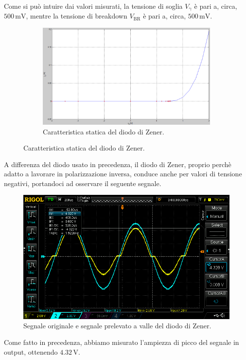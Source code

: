 \documentclass[a4paper]{article}
\begin{document}
{{				Come si può intuire dai valori misurati, la tensione di soglia $ V_{\mathrm{\gamma}} $ è pari a, circa, $ 500 \, \mathrm{mV} $, mentre la tensione di breakdown $ V_{\mathrm{BR}} $ è pari a, circa, $ 500 \, \mathrm{mV} $.
				\begin{figure}[h!]
					\centering
					\begin{subfigure}{0.4\textwidth}
						\centering
						\includegraphics[scale=0.3]{caratteristicheStaticheDiodoDiZenerCaratteristica}
						\caption{Caratteristica statica del diodo di Zener.}
					\end{subfigure}
					\label{fig:caratteristicheStaticheDiodoDiZener}
				\end{figure}
				A differenza del diodo usato in precedenza, il diodo di Zener, proprio perchè adatto a lavorare in polarizzazione inversa, conduce anche per valori di tensione negativi, portandoci ad osservare il seguente segnale.		
				\begin{figure}[h!]
					\centering
					\includegraphics[scale=0.5]{ampiezzaDiPiccoDiodoDiZener}
					\caption{Segnale originale e segnale prelevato a valle del diodo di Zener.}
					\label{fig:ampiezzaDiPiccoDiodoDiZener}
				\end{figure}
				\newline
				Come fatto in precedenza, abbiamo misurato l'ampiezza di picco del segnale in output, ottenendo $ 4.32 \, \mathrm{V} $.
}}
\end{document}
